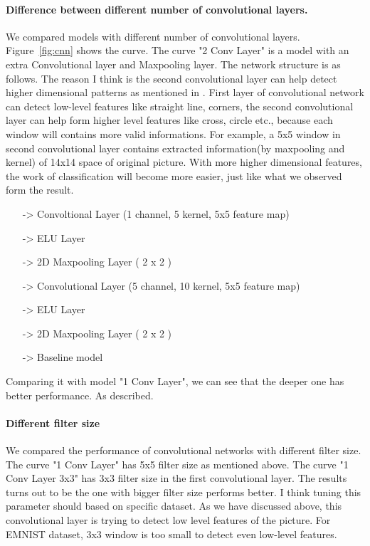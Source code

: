\documentclass{article}
\begin{document}
\paragraph{Difference between different number of convolutional layers. }
We compared models with different number of convolutional layers. Figure~\ref{fig:cnn} shows the curve. The curve "2 Conv Layer" is a model with an extra Convolutional layer and Maxpooling layer. The network structure is as follows. The reason I think is the second convolutional layer can help detect higher dimensional patterns as mentioned in \citep{Lecun98gradient-basedlearning}. First layer of convolutional network can detect low-level features like straight line, corners, the second convolutional layer can help form higher level features like cross, circle etc., because each window will contains more valid informations. For example, a 5x5 window in second convolutional layer contains extracted information(by maxpooling and kernel) of 14x14 space of original picture. With more higher dimensional features, the work of classification will become more easier, just like what we observed form the result.

\begin{itemize}
	\item[->] Convoltional Layer (1 channel, 5 kernel, 5x5 feature map)
	\item[->] ELU Layer
	\item[->] 2D Maxpooling Layer ( 2 x 2 )
	\item[->] Convolutional Layer (5 channel, 10 kernel, 5x5 feature map)
	\item[->] ELU Layer
	\item[->] 2D Maxpooling Layer ( 2 x 2 )
	\item[->] Baseline model
\end{itemize}

Comparing it with model "1 Conv Layer", we can see that the deeper one has better performance. As \citep{Lecun98gradient-basedlearning} described.

\paragraph{Different filter size}
We compared the performance of convolutional networks with different filter size. The curve "1 Conv Layer" has 5x5 filter size as mentioned above. The curve "1 Conv Layer 3x3" has 3x3 filter size in the first convolutional layer. The results turns out to be the one with bigger filter size performs better. I think tuning this parameter should based on specific dataset. As we have discussed above, this convolutional layer is trying to detect low level features of the picture. For EMNIST dataset, 3x3 window is too small to detect even low-level features.
\end{document}
